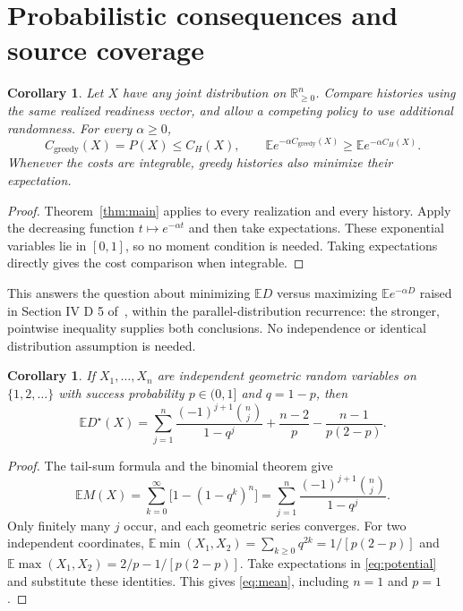 \documentclass[11pt,a4paper]{article}
\newtheorem{corollary}[theorem]{Corollary}
\newcommand{\R}{\mathbb R}
\newcommand{\E}{\mathbb E}
\newcommand{\Dstar}{D^{\star}}
\begin{document}
\section{Probabilistic consequences and source coverage}
\begin{corollary}\label{cor:attenuation}
Let $X$ have any joint distribution on $\R_{\geq0}^n$. Compare histories
using the same realized readiness vector, and allow a competing policy
to use additional randomness. For every $\alpha\geq0$,
\[
 C_{\mathrm{greedy}}(X)=P(X)\leq C_H(X),\qquad
 \E e^{-\alpha C_{\mathrm{greedy}}(X)}
 \geq\E e^{-\alpha C_H(X)}.
\]
Whenever the costs are integrable, greedy histories also minimize
their expectation.
\end{corollary}
\begin{proof}
Theorem~\ref{thm:main} applies to every realization and every history.
Apply the decreasing function $t\mapsto e^{-\alpha t}$ and then take
expectations. These exponential variables lie in $[0,1]$, so no moment
condition is needed. Taking expectations directly gives the cost
comparison when integrable.
\end{proof}

This answers the question about minimizing $\E D$ versus maximizing
$\E e^{-\alpha D}$ raised in Section IV D 5 of~\cite[p.~023086-16]{kamin},
within the parallel-distribution recurrence: the stronger, pointwise
inequality supplies both conclusions. No independence or identical
distribution assumption is needed.

\begin{corollary}\label{cor:mean}
If $X_1,\ldots,X_n$ are independent geometric random variables on
$\{1,2,\ldots\}$ with success probability $p\in(0,1]$ and $q=1-p$, then
\begin{equation}\label{eq:mean}
 \E\Dstar(X)=
 \sum_{j=1}^{n}\frac{(-1)^{j+1}\binom nj}{1-q^j}
 +\frac{n-2}{p}-\frac{n-1}{p(2-p)}.
\end{equation}
\end{corollary}
\begin{proof}
The tail-sum formula and the binomial theorem give
\[
 \E M(X)=\sum_{k=0}^{\infty}\bigl[1-(1-q^k)^n\bigr]
 =\sum_{j=1}^n\frac{(-1)^{j+1}\binom nj}{1-q^j}.
\]
Only finitely many $j$ occur, and each geometric series converges.
For two independent coordinates,
$\E\min(X_1,X_2)=\sum_{k\geq0}q^{2k}=1/[p(2-p)]$ and
$\E\max(X_1,X_2)=2/p-1/[p(2-p)]$.
Take expectations in \eqref{eq:potential} and substitute these
identities. This gives \eqref{eq:mean}, including $n=1$ and $p=1$.
\end{proof}
\end{document}
